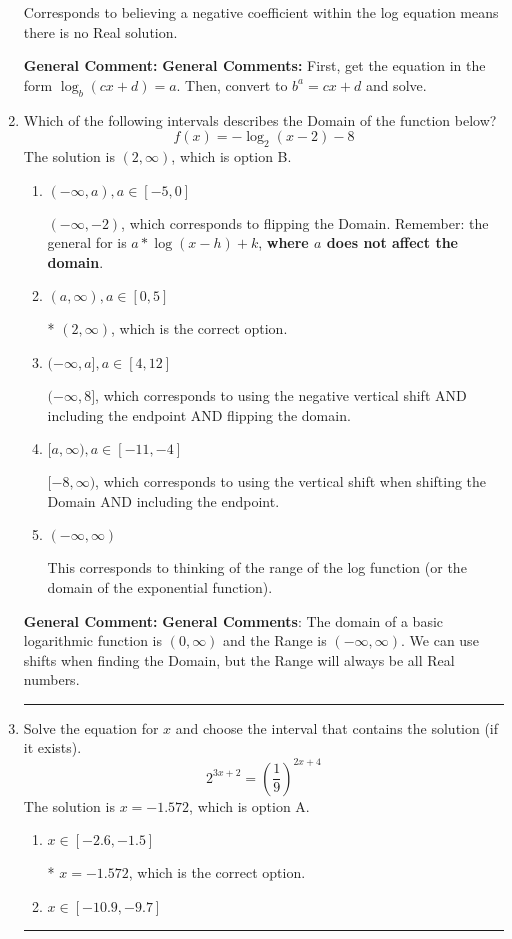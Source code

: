 \documentclass{extbook}[14pt]
\newcommand{\litem}[1]{\item #1

\rule{\textwidth}{0.4pt}}
\begin{document}
\begin{enumerate}
{\begin{enumerate}[label=\Alph*.]
Corresponds to believing a negative coefficient within the log equation means there is no Real solution.
\end{enumerate}

\textbf{General Comment:} \textbf{General Comments:} First, get the equation in the form $\log_b{(cx+d)} = a$. Then, convert to $b^a = cx+d$ and solve.
}
\litem{
Which of the following intervals describes the Domain of the function below?
\[ f(x) = -\log_2{(x-2)}-8 \]The solution is \( (2, \infty) \), which is option B.\begin{enumerate}[label=\Alph*.]
\item \( (-\infty, a), a \in [-5, 0] \)

$(-\infty, -2)$, which corresponds to flipping the Domain. Remember: the general for is $a*\log(x-h)+k$, \textbf{where $a$ does not affect the domain}.
\item \( (a, \infty), a \in [0, 5] \)

* $(2, \infty)$, which is the correct option.
\item \( (-\infty, a], a \in [4, 12] \)

$(-\infty, 8]$, which corresponds to using the negative vertical shift AND including the endpoint AND flipping the domain.
\item \( [a, \infty), a \in [-11, -4] \)

$[-8, \infty)$, which corresponds to using the vertical shift when shifting the Domain AND including the endpoint.
\item \( (-\infty, \infty) \)

This corresponds to thinking of the range of the log function (or the domain of the exponential function).
\end{enumerate}

\textbf{General Comment:} \textbf{General Comments}: The domain of a basic logarithmic function is $(0, \infty)$ and the Range is $(-\infty, \infty)$. We can use shifts when finding the Domain, but the Range will always be all Real numbers.
}
\litem{
Solve the equation for $x$ and choose the interval that contains the solution (if it exists).
\[ 2^{3x+2} = \left(\frac{1}{9}\right)^{2x+4} \]The solution is \( x = -1.572 \), which is option A.\begin{enumerate}[label=\Alph*.]
\item \( x \in [-2.6, -1.5] \)

* $x = -1.572$, which is the correct option.
\item \( x \in [-10.9, -9.7] \)


\end{enumerate}}
\end{enumerate}
\end{document}
